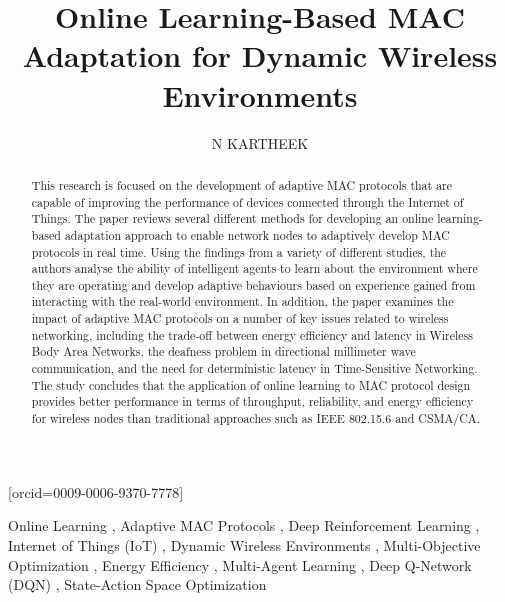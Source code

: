 \documentclass[a4paper,fleqn]{cas-dc}
\numberwithin{equation}{section}
\begin{document}
\let\WriteBookmarks\relax
\def\floatpagepagefraction{1}
\def\textpagefraction{.001}


\title [mode = title]{Online Learning-Based MAC Adaptation for Dynamic Wireless Environments}                      


\author[1]{N KARTHEEK}[orcid=0009-0006-9370-7778]
\address[1]{School of Computer Science and Engineering, VIT-AP University, Amaravathi. Andhra Pradesh, India}




\begin{abstract}
This research is focused on the development of adaptive MAC protocols that are capable of improving the performance of devices connected through the Internet of Things. The paper reviews several different methods for developing an online learning-based adaptation approach to enable network nodes to adaptively develop MAC protocols in real time. Using the findings from a variety of different studies, the authors analyse the ability of intelligent agents to learn about the environment where they are operating and develop adaptive behaviours based on experience gained from interacting with the real-world environment. In addition, the paper examines the impact of adaptive MAC protocols on a number of key issues related to wireless networking, including the trade-off between energy efficiency and latency in Wireless Body Area Networks, the deafness problem in directional millimeter wave communication, and the need for deterministic latency in Time-Sensitive Networking. The study concludes that the application of online learning to MAC protocol design provides better performance in terms of throughput, reliability, and energy efficiency for wireless nodes than traditional approaches such as IEEE 802.15.6 and CSMA/CA.
\end{abstract}

\begin{keywords}
Online Learning \sep 
Adaptive MAC Protocols \sep 
Deep Reinforcement Learning \sep 
Internet of Things (IoT) \sep
Dynamic Wireless Environments \sep 
Multi-Objective Optimization \sep
Energy Efficiency \sep
Multi-Agent Learning \sep
Deep Q-Network (DQN) \sep
State-Action Space Optimization
\end{keywords}
\end{document}
